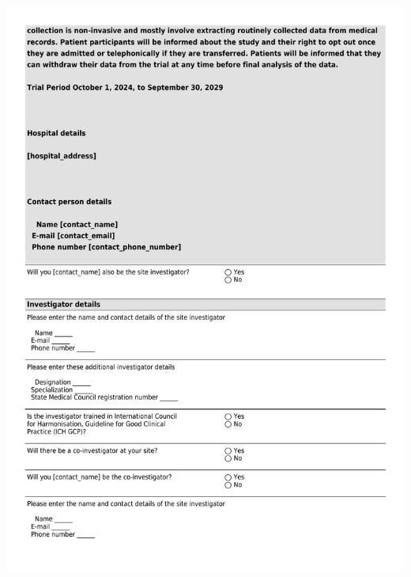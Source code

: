 \documentclass[
]{scrartcl}
\begin{document}
\includegraphics{./appendices/hospital-screening-interview-instrument/hospital-screening-interview-2.pdf}
\end{document}
